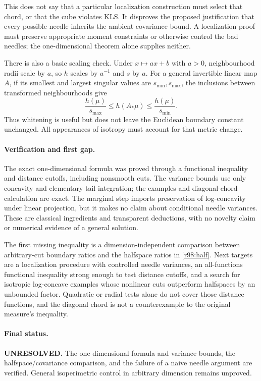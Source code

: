\documentclass[11pt]{article}
\begin{document}
This does not say that a particular localization construction must
select that chord, or that the cube violates KLS. It disproves the
proposed justification that every possible needle inherits the
ambient covariance bound. A localization proof must preserve
appropriate moment constraints or otherwise control the bad
needles; the one-dimensional theorem alone supplies neither.

There is also a basic scaling check. Under $x\mapsto ax+b$ with
$a>0$, neighbourhood radii scale by $a$, so $h$ scales by $a^{-1}$
and $s$ by $a$. For a general invertible linear map $A$, if its
smallest and largest singular values are $s_{\min},s_{\max}$, the
inclusions between transformed neighbourhoods give
\[
 \frac{h(\mu)}{s_{\max}}
 \le h(A_*\mu)\le\frac{h(\mu)}{s_{\min}}.
\]
Thus whitening is useful but does not leave the Euclidean boundary
constant unchanged. All appearances of isotropy must account for
that metric change.

\paragraph{Verification and first gap.}
The exact one-dimensional formula was proved through a functional
inequality and distance cutoffs, including nonsmooth cuts. The
variance bounds use only concavity and elementary tail integration;
the examples and diagonal-chord calculation are exact. The marginal
step imports preservation of log-concavity under linear projection,
but it makes no claim about conditional needle variances. These are
classical ingredients and transparent deductions, with no novelty
claim or numerical evidence of a general solution.

The first missing inequality is a dimension-independent comparison
between arbitrary-cut boundary ratios and the halfspace ratios in
\eqref{r98:half}. Next targets are a localization procedure with
controlled needle variances, an all-functions functional inequality
strong enough to test distance cutoffs, and a search for isotropic
log-concave examples whose nonlinear cuts outperform halfspaces by
an unbounded factor. Quadratic or radial tests alone do not cover
those distance functions, and the diagonal chord is not a
counterexample to the original measure's inequality.

\paragraph{Final status.}
\textbf{UNRESOLVED.} The one-dimensional formula and variance bounds,
the halfspace/covariance comparison, and the failure of a naive
needle argument are verified. General isoperimetric control in
arbitrary dimension remains unproved.
\end{document}
